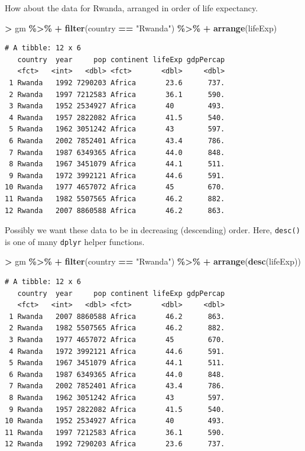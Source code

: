 \documentclass[
]{krantz}
\makeatletter
\newenvironment{Shaded}{\begin{snugshade}}{\end{snugshade}}
\newcommand{\KeywordTok}[1]{\textcolor[rgb]{0.27,0.27,0.27}{\textbf{#1}}}
\newcommand{\NormalTok}[1]{#1}
\newcommand{\OperatorTok}[1]{\textcolor[rgb]{0.43,0.43,0.43}{\textbf{#1}}}
\newcommand{\StringTok}[1]{\textcolor[rgb]{0.5,0.5,0.5}{#1}}
\newenvironment{kframe}{%
\medskip{}
\setlength{\fboxsep}{.8em}
 \def\at@end@of@kframe{}%
 \ifinner\ifhmode%
  \def\at@end@of@kframe{\end{minipage}}%
  \begin{minipage}{\columnwidth}%
 \fi\fi%
 \def\FrameCommand##1{\hskip\@totalleftmargin \hskip-\fboxsep
 \colorbox{shadecolor}{##1}\hskip-\fboxsep
     \hskip-\linewidth \hskip-\@totalleftmargin \hskip\columnwidth}%
 \MakeFramed {\advance\hsize-\width
   \@totalleftmargin\z@ \linewidth\hsize
   \@setminipage}}%
 {\par\unskip\endMakeFramed%
 \at@end@of@kframe}
\renewenvironment{Shaded}{\begin{kframe}}{\end{kframe}}
\makeatother
\begin{document}
How about the data for Rwanda, arranged in order of life expectancy.

\begin{Shaded}
\begin{Highlighting}[]
\OperatorTok{\textgreater{}}\StringTok{ }\NormalTok{gm }\OperatorTok{\%\textgreater{}\%}\StringTok{ }
\OperatorTok{+}\StringTok{   }\KeywordTok{filter}\NormalTok{(country }\OperatorTok{==}\StringTok{ "Rwanda"}\NormalTok{) }\OperatorTok{\%\textgreater{}\%}\StringTok{ }
\OperatorTok{+}\StringTok{   }\KeywordTok{arrange}\NormalTok{(lifeExp)}
\end{Highlighting}
\end{Shaded}

\begin{verbatim}
# A tibble: 12 x 6
   country  year     pop continent lifeExp gdpPercap
   <fct>   <int>   <dbl> <fct>       <dbl>     <dbl>
 1 Rwanda   1992 7290203 Africa       23.6      737.
 2 Rwanda   1997 7212583 Africa       36.1      590.
 3 Rwanda   1952 2534927 Africa       40        493.
 4 Rwanda   1957 2822082 Africa       41.5      540.
 5 Rwanda   1962 3051242 Africa       43        597.
 6 Rwanda   2002 7852401 Africa       43.4      786.
 7 Rwanda   1987 6349365 Africa       44.0      848.
 8 Rwanda   1967 3451079 Africa       44.1      511.
 9 Rwanda   1972 3992121 Africa       44.6      591.
10 Rwanda   1977 4657072 Africa       45        670.
11 Rwanda   1982 5507565 Africa       46.2      882.
12 Rwanda   2007 8860588 Africa       46.2      863.
\end{verbatim}

Possibly we want these data to be in decreasing (descending) order. Here, \texttt{desc()} is one of many \texttt{dplyr} helper functions.

\begin{Shaded}
\begin{Highlighting}[]
\OperatorTok{\textgreater{}}\StringTok{ }\NormalTok{gm }\OperatorTok{\%\textgreater{}\%}\StringTok{ }
\OperatorTok{+}\StringTok{   }\KeywordTok{filter}\NormalTok{(country }\OperatorTok{==}\StringTok{ "Rwanda"}\NormalTok{) }\OperatorTok{\%\textgreater{}\%}\StringTok{ }
\OperatorTok{+}\StringTok{   }\KeywordTok{arrange}\NormalTok{(}\KeywordTok{desc}\NormalTok{(lifeExp))}
\end{Highlighting}
\end{Shaded}

\begin{verbatim}
# A tibble: 12 x 6
   country  year     pop continent lifeExp gdpPercap
   <fct>   <int>   <dbl> <fct>       <dbl>     <dbl>
 1 Rwanda   2007 8860588 Africa       46.2      863.
 2 Rwanda   1982 5507565 Africa       46.2      882.
 3 Rwanda   1977 4657072 Africa       45        670.
 4 Rwanda   1972 3992121 Africa       44.6      591.
 5 Rwanda   1967 3451079 Africa       44.1      511.
 6 Rwanda   1987 6349365 Africa       44.0      848.
 7 Rwanda   2002 7852401 Africa       43.4      786.
 8 Rwanda   1962 3051242 Africa       43        597.
 9 Rwanda   1957 2822082 Africa       41.5      540.
10 Rwanda   1952 2534927 Africa       40        493.
11 Rwanda   1997 7212583 Africa       36.1      590.
12 Rwanda   1992 7290203 Africa       23.6      737.
\end{verbatim}
\end{document}
